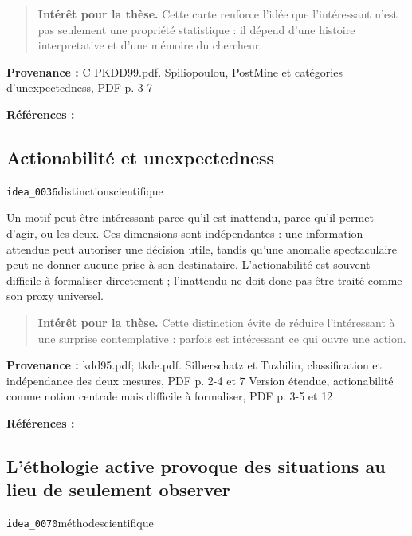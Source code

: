 \documentclass[10pt,a4paper]{article}
\begin{document}
\begin{quote}
\textbf{Intérêt pour la thèse.} Cette carte renforce l'idée que l'intéressant n'est pas seulement une propriété statistique : il dépend d'une histoire interpretative et d'une mémoire du chercheur.
\end{quote}
{\footnotesize\color{metadata}\textbf{Provenance :} C PKDD99.pdf. Spiliopoulou, PostMine et catégories d'unexpectedness, PDF p. 3-7\par}
{\footnotesize\color{metadata}\textbf{Références :} \parencite{spiliopoulou1999rules}\par}

\subsection{Actionabilité et unexpectedness}
{\small\color{metadata} \texttt{idea\_0036}\quad\textbullet\quad distinction\quad\textbullet\quad scientifique\par}

Un motif peut être intéressant parce qu'il est inattendu, parce qu'il permet d'agir, ou les deux. Ces dimensions sont indépendantes : une information attendue peut autoriser une décision utile, tandis qu'une anomalie spectaculaire peut ne donner aucune prise à son destinataire. L'actionabilité est souvent difficile à formaliser directement ; l'inattendu ne doit donc pas être traité comme son proxy universel.

\begin{quote}
\textbf{Intérêt pour la thèse.} Cette distinction évite de réduire l'intéressant à une surprise contemplative : parfois est intéressant ce qui ouvre une action.
\end{quote}
{\footnotesize\color{metadata}\textbf{Provenance :} kdd95.pdf; tkde.pdf. Silberschatz et Tuzhilin, classification et indépendance des deux mesures, PDF p. 2-4 et 7 Version étendue, actionabilité comme notion centrale mais difficile à formaliser, PDF p. 3-5 et 12\par}
{\footnotesize\color{metadata}\textbf{Références :} \parencite{silberschatz1995subjective,silberschatz1996patterns}\par}

\subsection{L'éthologie active provoque des situations au lieu de seulement observer}
{\small\color{metadata} \texttt{idea\_0070}\quad\textbullet\quad méthode\quad\textbullet\quad scientifique\par}
\end{document}
